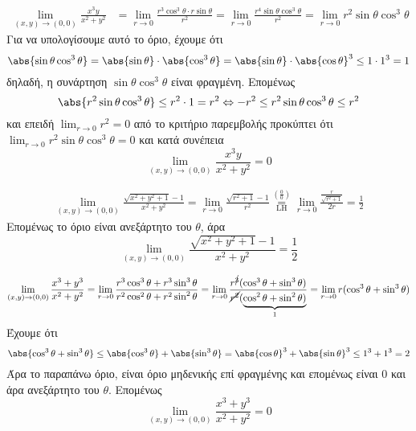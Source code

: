 \documentclass[a4paper,11pt]{report}
\begin{document}
\begin{example}
  \begin{align*}
    \lim\limits_{(x,y)\to (0, 0)} \frac{x^{3}y}{x^{2}+y^{2}} &= 
    \lim_{r \to 0} \frac{r^{3} \cos^{3}{\theta} \cdot r 
      \sin{\theta}}{r^{2}} = \lim_{r \to 0} \frac{r^{4} \sin{\theta} 
    \cos^{3}{\theta}}{r^{2}} = 
    \lim_{r \to 0} r^{2} \sin{\theta} \cos^{3}{\theta} 
  \end{align*}
  Για να υπολογίσουμε αυτό το όριο, έχουμε ότι
  \[
    \abs{\sin{\theta} \cos^{3}{\theta}} = \abs{\sin{\theta}} \cdot 
    \abs{\cos^{3}{\theta}} = \abs{\sin{\theta}} \cdot \abs{\cos{\theta}}^{3} \leq 
    1 \cdot 1^{3} = 1 
  \] 
  δηλαδή, η συνάρτηση $ \sin{\theta} \cos^{3}{\theta} $ είναι φραγμένη.
  Επομένως
  \[ 
    \abs{r^{2} \sin{\theta} \cos^{3}{\theta}} \leq r^{2} \cdot 1 = r^{2} \Leftrightarrow 
    -r^{2} \leq r^{2} \sin{\theta} \cos^{3}{\theta} \leq r^{2}
  \] 
  και επειδή $ \lim_{r \to 0} r^{2} = 0 $ από το κριτήριο παρεμβολής προκύπτει ότι 
  $ \lim_{r \to 0} r^{2} \sin{\theta} \cos^{3}{\theta} = 0 $ και κατά συνέπεια
  \[
    \lim\limits_{(x,y)\to (0,0)} \frac{x^{3}y}{x^{2}+y^{2}} = 0
  \] 
\end{example}

\begin{example}
  \begin{align*}
    \lim\limits_{(x,y)\to (0, 0)} \frac{\sqrt{x^{2}+y^{2}+1}-1}
    {x^{2}+y^{2}} = \lim_{r \to 0} \frac{\sqrt{r^{2}+1} -1}{r^{2}} 
    \overset{\left(\frac{0}{0}\right)}{\underset{\text{LH}}{=}} 
    \lim_{r \to 0} \frac{\frac{r}{\sqrt{r^{2}+1}}}{2r} = \frac{1}{2}
  \end{align*}
  Επομένως το όριο είναι ανεξάρτητο του $\theta$, άρα 
  \[
    \lim\limits_{(x,y)\to (0, 0)} 
    \frac{\sqrt{x^{2}+y^{2}+1} -1}{x^{2}+y^{2}} = \frac{1}{2} 
  \] 
\end{example}

\begin{example}
  \[ 
    \lim\limits_{(x,y)\to (0, 0)} \frac{x^{3}+y^{3}}{x^{2}+y^{2}} = \lim_{r \to 0}
    \frac{r^{3} \cos^{3}{\theta} + r^{3} \sin^{3}{\theta}}{r^{2} \cos^{2}{\theta} +
      r^{2} \sin^{2}{\theta}} = \lim_{r \to 0} \frac{r^{\cancel{3}}(\cos^{3}{\theta} +
      \sin^{3}{\theta})}{\cancel{r^{2}}(\underbrace{\cos^{2}{\theta} +
    \sin^{2}{\theta})}_{1}} = 
    \lim_{r \to 0} r(\cos^{3}{\theta} + \sin^{3}{\theta}) 
  \] 
  Έχουμε ότι
  \[
    \abs{\cos^{3}{\theta} + \sin^{3}{\theta}} \leq \abs{\cos^{3}{\theta}} + 
    \abs{\sin^{3}{\theta}} = \abs{\cos{\theta} }^{3} + \abs{\sin{\theta} }^{3} \leq 
    1^{3} + 1^{3} = 2
  \] 
  Άρα το παραπάνω όριο, είναι όριο μηδενικής επί φραγμένης και επομένως είναι 0 και άρα
  ανεξάρτητο του $\theta$. Επομένως 
  \[
    \lim\limits_{(x,y)\to (0, 0)} \frac{x^{3}+y^{3}}{x^{2}+y^{2}} = 0 
  \] 
\end{example}
\end{document}

